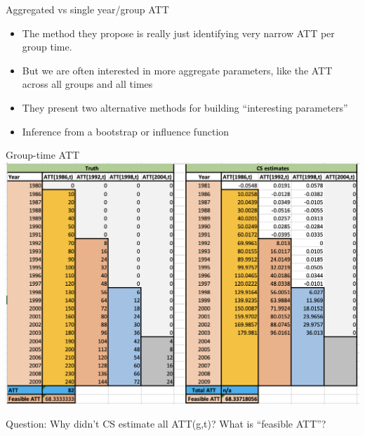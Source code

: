 \documentclass{beamer}
\begin{document}
\begin{frame}{Aggregated vs single year/group ATT}

\begin{itemize}
\item The method they propose is really just identifying very narrow ATT per group time.
\item But we are often interested in  more aggregate parameters, like the ATT across all groups and all times
\item They present two alternative methods for building ``interesting parameters'' 
\item Inference from a bootstrap or influence function
\end{itemize}


\end{frame}



\begin{frame}{Group-time ATT }
             \includegraphics[scale=0.45]{./lecture_includes/baker_attgt_cs}

Question: Why didn't CS estimate all ATT(g,t)? What is ``feasible ATT''?

\end{frame}
\end{document}
